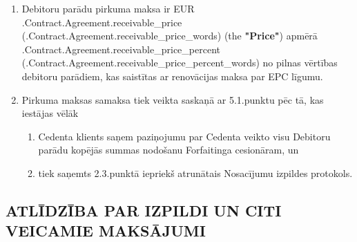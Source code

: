 \documentclass[a4paper]{article}
\begin{document}
\begin{enumerate}
\item{Debitoru parādu pirkuma maksa ir EUR
    \iffalse input forfaitingFields.receivable_price value="{{.Contract.Agreement.receivable_price}}" type="number" \fi {{.Contract.Agreement.receivable_price}} (\iffalse input forfaitingFields.receivable_price_words value="{{.Contract.Agreement.receivable_price_words}}" \fi {{.Contract.Agreement.receivable_price_words}}) (the \textbf{"Price"}) apmērā
    \iffalse input forfaitingFields.receivable_price_percent value="{{.Contract.Agreement.receivable_price_percent}}" type="number" \fi {{.Contract.Agreement.receivable_price_percent}} (\iffalse input forfaitingFields.receivable_price_percent_words value="{{.Contract.Agreement.receivable_price_percent_words}}" \fi {{.Contract.Agreement.receivable_price_percent_words}}) no pilnas vērtības debitoru parādiem, kas saistītas ar renovācijas maksa par EPC
līgumu.}

\item{Pirkuma maksas samaksa tiek veikta saskaņā ar 5.1.punktu pēc tā, kas iestājas vēlāk}

    \begin{enumerate}
    \item{Cedenta klients saņem paziņojumu par Cedenta veikto visu Debitoru parādu kopējās
summas nodošanu Forfaitinga cesionāram, un }

    \item{tiek saņemts 2.3.punktā iepriekš atrunātais Nosacījumu izpildes protokols.}
    \end{enumerate}
\end{enumerate}

\subsection{ATLĪDZĪBA PAR IZPILDI UN CITI VEICAMIE MAKSĀJUMI}
\end{document}
